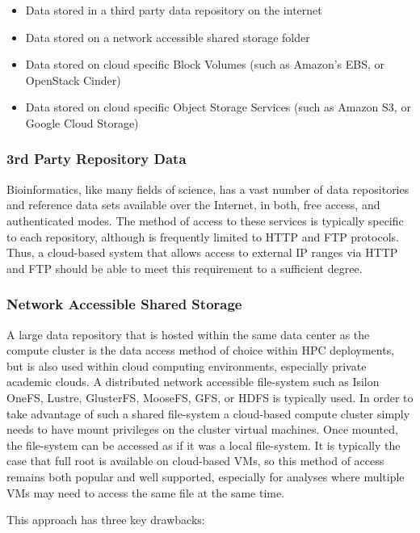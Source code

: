 \begin{itemize}
\item Data stored in a third party data repository on the internet
\item Data stored on a network accessible shared storage folder
\item Data stored on cloud specific Block Volumes (such as Amazon's EBS, or OpenStack Cinder)
\item Data stored on cloud specific Object Storage Services\autocite{factor2005object} (such as Amazon S3, or Google Cloud Storage)
\end{itemize}

\subsubsection{3rd Party Repository Data}

Bioinformatics, like many fields of science, has a vast number of data repositories and reference data sets available over the Internet, in both, free access, and authenticated modes. The method of access to these services is typically specific to each repository, although is frequently limited to HTTP and FTP protocols. Thus, a cloud-based system that allows access to external IP ranges via HTTP and FTP should be able to meet this requirement to a sufficient degree.

\subsubsection{Network Accessible Shared Storage}

A large data repository that is hosted within the same data center as the compute cluster is the data access method of choice within HPC deployments, but is also used within cloud computing environments, especially private academic clouds. A distributed network accessible file-system such as Isilon OneFS, Lustre, GlusterFS, MooseFS, GFS, or HDFS is typically used\autocite{sawant2013big}.  In order to take advantage of such a shared file-system a cloud-based compute cluster simply needs to have mount privileges on the cluster virtual machines. Once mounted, the file-system can be accessed as if it was a local file-system. It is typically the case that full root is available on cloud-based VMs, so this method of access remains both popular and well supported, especially for analyses where multiple VMs may need to access the same file at the same time. 

This approach has three key drawbacks:

